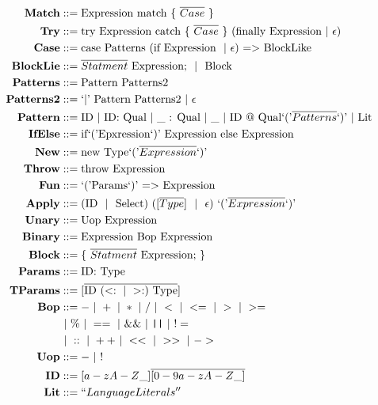 \documentclass[12pt]{article}
\newcommand\bnf{\,\,|\,\,}
\renewcommand\c[1]{\text{#1}}
\begin{document}
\begin{align*}
  \textbf{Match} & ::= \c{Expression match \{ $\overline{Case}$ \}} \\
  \textbf{Try} & :: = \c{try Expression catch \{}~\overline{Case} \c{ \} }
      (\c{finally Expression} \bnf \epsilon) \\
  \textbf{Case} & ::= \c{case Patterns (if Expression $\bnf \epsilon$) $=>$
        BlockLike} \\
  \textbf{BlockLie} & ::= \c{$\overline{Statment}$ Expression; $\bnf$ Block} \\
  \textbf{Patterns} & ::= \c{Pattern Patterns2} \\
  \textbf{Patterns2} & ::= \c{`$|$' Pattern Patterns2} \bnf \epsilon \\
  \textbf{Pattern} & ::= \c{ID} \bnf \c{ID: Qual} \bnf \c{\_ : Qual} \bnf
        \c{\_} \bnf \c{ID @ Qual`('$\overline{Patterns}$`)'} \bnf \c{Lit} \\
  \textbf{IfElse} & ::= \c{if`('Epxression`)' Expression else Expression} \\
  \textbf{New} & ::= \c{new Type`('$\overline{Expression}$`)'} \\
  \textbf{Throw} & ::= \c{throw Expression} \\
  \textbf{Fun} & ::= \c{`('Params`)' $=>$ Expression} \\
  \textbf{Apply} & ::= \c{(ID $\bnf$ Select) ([$\overline{Type}$] 
        $\bnf$ $\epsilon$) `('$\overline{Expression}$`)'} \\
  \textbf{Unary} & ::= \c{Uop Expression} \\
  \textbf{Binary} & ::= \c{Expression Bop Expression} \\
  \textbf{Block} & ::= \c{\{ $\overline{Statment}$ Expression; \}} \\
  \textbf{Params} & ::= \c{ID: Type} \\
  \textbf{TParams} & ::= [\overline{\c{ID}~(<: \bnf >:)~\c{Type}}] \\
  \textbf{Bop} & ::= - \bnf + \bnf * \bnf / \bnf < \bnf <= \bnf > \bnf >= \\
      & \bnf \% \bnf == \bnf \&\& \bnf \texttt{||} \bnf != \\
      & \bnf :: \bnf ++ \bnf << \bnf >> \bnf -> \\
  \textbf{Uop} & ::= - \bnf ! \\
  \textbf{ID} & ::= [a-zA-Z\_]\overline{[0-9a-zA-Z\_]} \\
  \textbf{Lit} & ::= ``Language Literals''
\end{align*}
\end{document}

